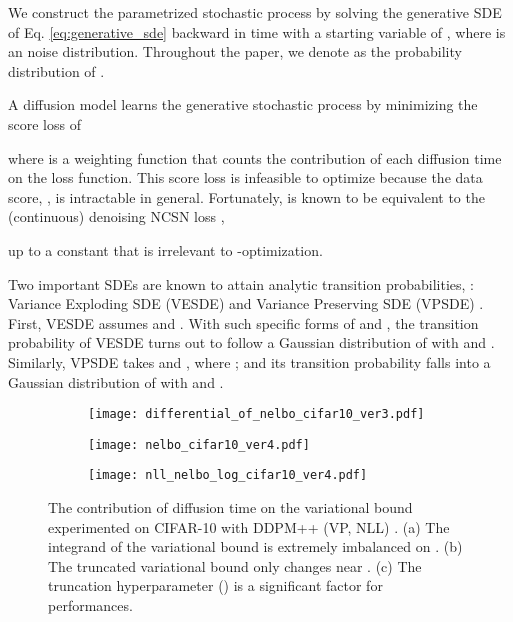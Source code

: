 \documentclass[nohyperref]{article}
\theoremstyle{plain}
\theoremstyle{definition}
\theoremstyle{remark}
\begin{document}
We construct the parametrized stochastic process by solving the generative SDE of Eq. \eqref{eq:generative_sde} backward in time with a starting variable of , where  is an noise distribution. Throughout the paper, we denote  as the probability distribution of .

A diffusion model learns the generative stochastic process by minimizing the score loss \cite{song2021maximum} of

where  is a weighting function that counts the contribution of each diffusion time on the loss function. This score loss is infeasible to optimize because the data score, , is intractable in general. Fortunately,  is known to be equivalent to the (continuous) denoising NCSN loss \cite{song2020score, song2019generative},

up to a constant that is irrelevant to -optimization.

Two important SDEs are known to attain analytic transition probabilities, : Variance Exploding SDE (VESDE) and Variance Preserving SDE (VPSDE) \cite{song2020score}. First, VESDE assumes  and . With such specific forms of  and , the transition probability of VESDE turns out to follow a Gaussian distribution of  with  and . Similarly, VPSDE takes  and , where ; and its transition probability falls into a Gaussian distribution of  with  and .

\begin{figure*}[t]
\centering
	\begin{subfigure}{0.32\linewidth}
	\centering
		\texttt{[image: differential\_of\_nelbo\_cifar10\_ver3.pdf]}
	\end{subfigure}
	\begin{subfigure}{0.32\linewidth}
	\centering
		\texttt{[image: nelbo\_cifar10\_ver4.pdf]}
	\end{subfigure}
	\begin{subfigure}{0.32\linewidth}
		\texttt{[image: nll\_nelbo\_log\_cifar10\_ver4.pdf]}
	\end{subfigure}
	\caption{The contribution of diffusion time on the variational bound experimented on CIFAR-10 with DDPM++ (VP, NLL) \cite{song2021maximum}. (a) The integrand of the variational bound is extremely imbalanced on . (b) The truncated variational bound only changes near . (c) The truncation hyperparameter () is a significant factor for performances.}
	\label{fig:nelbo}
\end{figure*}
\end{document}
